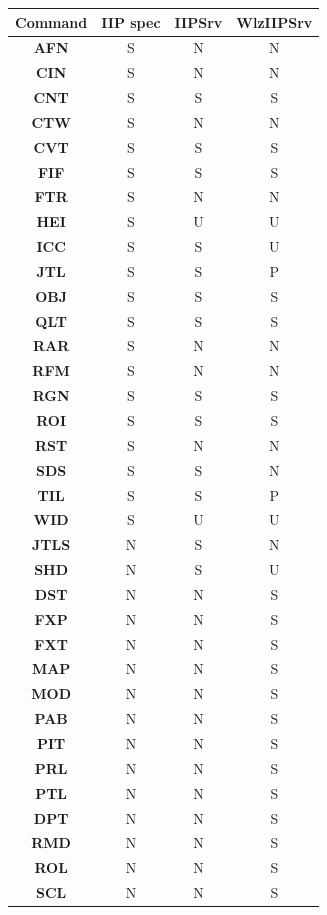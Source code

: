\documentclass[11pt]{article}
\newcommand{\com}[1]{\textbf{#1}}
\begin{document}
\begin{table}[!hp]
\centering
\tiny{
\begin{tabular}{|c|c|c|c|}
\hline
\textbf{Command} &  \textbf{IIP spec} & \textbf{IIPSrv} & \textbf{WlzIIPSrv}\\
\hline
\com{AFN}  & S & N & N \\
\com{CIN}  & S & N & N \\
\com{CNT}  & S & S & S \\
\com{CTW}  & S & N & N \\
\com{CVT}  & S & S & S \\
\com{FIF}  & S & S & S \\
\com{FTR}  & S & N & N \\
\com{HEI}  & S & U & U \\
\com{ICC}  & S & S & U \\
\com{JTL}  & S & S & P \\
\com{OBJ}  & S & S & S \\
\com{QLT}  & S & S & S \\
\com{RAR}  & S & N & N \\
\com{RFM}  & S & N & N \\
\com{RGN}  & S & S & S \\
\com{ROI}  & S & S & S \\
\com{RST}  & S & N & N \\
\com{SDS}  & S & S & N \\
\com{TIL}  & S & S & P \\
\com{WID}  & S & U & U \\
\hline
\com{JTLS} & N & S & N \\
\com{SHD}  & N & S & U \\
\hline
\com{DST}  & N & N & S \\
\com{FXP}  & N & N & S \\
\com{FXT}  & N & N & S \\
\com{MAP}  & N & N & S \\
\com{MOD}  & N & N & S \\
\com{PAB}  & N & N & S \\
\com{PIT}  & N & N & S \\
\com{PRL}  & N & N & S \\
\com{PTL}  & N & N & S \\
\com{DPT}  & N & N & S \\
\com{RMD}  & N & N & S \\
\com{ROL}  & N & N & S \\
\com{SCL}  & N & N & S \\

\end{tabular}}
\end{table}
\end{document}
